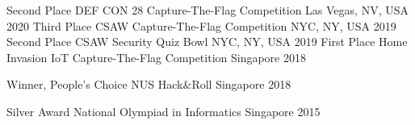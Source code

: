 


\begin{cvhonors}

  \cvhonor
    {Second Place} %
    {DEF CON 28 Capture-The-Flag Competition} %
    {Las Vegas, NV, USA} %
    {2020} %
  \cvhonor
    {Third Place} %
    {CSAW Capture-The-Flag Competition} %
    {NYC, NY, USA} %
    {2019} %
  \cvhonor
    {Second Place} %
    {CSAW Security Quiz Bowl} %
    {NYC, NY, USA} %
    {2019} %
  \cvhonor
    {First Place} %
    {Home Invasion IoT Capture-The-Flag Competition} %
    {Singapore} %
    {2018} %


  \cvhonor
    {Winner, People's Choice} %
    {NUS Hack\&Roll} %
    {Singapore} %
    {2018} %

  \cvhonor
    {Silver Award} %
    {National Olympiad in Informatics} %
    {Singapore} %
    {2015} %

\end{cvhonors}
